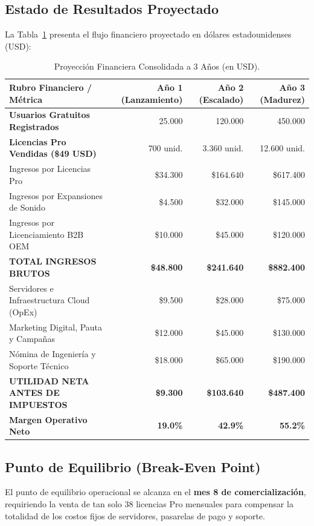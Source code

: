 \documentclass[11pt,a4paper]{article}
\begin{document}
\subsection{Estado de Resultados Proyectado}

La Tabla~\ref{tab:financials} presenta el flujo financiero proyectado en dólares estadounidenses (USD):

\begin{table}[h!]
\centering
\caption{Proyección Financiera Consolidada a 3 Años (en USD).}
\label{tab:financials}
\vspace{0.2cm}
{\small
\begin{tabular}{lrrr}
\toprule
\textbf{Rubro Financiero / Métrica} & \textbf{Año 1 (Lanzamiento)} & \textbf{Año 2 (Escalado)} & \textbf{Año 3 (Madurez)} \\
\midrule
\textbf{Usuarios Gratuitos Registrados} & 25.000 & 120.000 & 450.000 \\
\textbf{Licencias Pro Vendidas (\$49 USD)} & 700 unid. & 3.360 unid. & 12.600 unid. \\
\midrule
Ingresos por Licencias Pro & \$34.300 & \$164.640 & \$617.400 \\
Ingresos por Expansiones de Sonido & \$4.500 & \$32.000 & \$145.000 \\
Ingresos por Licenciamiento B2B OEM & \$10.000 & \$45.000 & \$120.000 \\
\midrule
\textbf{TOTAL INGRESOS BRUTOS} & \textbf{\$48.800} & \textbf{\$241.640} & \textbf{\$882.400} \\
\midrule
Servidores e Infraestructura Cloud (OpEx) & \$9.500 & \$28.000 & \$75.000 \\
Marketing Digital, Pauta y Campañas & \$12.000 & \$45.000 & \$130.000 \\
Nómina de Ingeniería y Soporte Técnico & \$18.000 & \$65.000 & \$190.000 \\
\midrule
\textbf{UTILIDAD NETA ANTES DE IMPUESTOS} & \textbf{\$9.300} & \textbf{\$103.640} & \textbf{\$487.400} \\
\textbf{Margen Operativo Neto} & \textbf{19.0\%} & \textbf{42.9\%} & \textbf{55.2\%} \\
\bottomrule
\end{tabular}
}
\end{table}

\subsection{Punto de Equilibrio (Break-Even Point)}
El punto de equilibrio operacional se alcanza en el \textbf{mes 8 de comercialización}, requiriendo la venta de tan solo 38 licencias Pro mensuales para compensar la totalidad de los costos fijos de servidores, pasarelas de pago y soporte.
\end{document}

